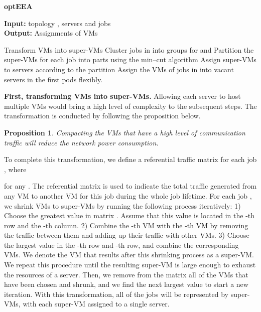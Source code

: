\documentclass[journal,single-space,two column,twoside,10pt]{IEEEtran}
\newtheorem{proposition}{Proposition}
\begin{document}
\setlength{\textfloatsep}{10pt}
\begin{algorithm}[!t]
\caption{\label{alg:vma} \textbf{optEEA}}
\textbf{Input: } topology , servers  and jobs \\
\textbf{Output: } Assignments of VMs 

\begin{algorithmic}[1]
\FOR{}
	\STATE Transform VMs into super-VMs
\ENDFOR
\STATE Cluster jobs in  into groups  for  and  
\FOR{}
	\STATE Partition the super-VMs for each job  into  parts using the min--cut algorithm
	\STATE Assign super-VMs to servers according to the partition
\ENDFOR
\STATE Assign the VMs of jobs in  into vacant servers in the first  pods flexibly.
\end{algorithmic}
\end{algorithm}

\textbf{First, transforming VMs into super-VMs.} Allowing each server to host multiple VMs would bring a high level of complexity to the subsequent steps. The transformation is conducted by following the proposition below.
\begin{proposition}
\label{prop:transformation}
Compacting the VMs that have a high level of communication traffic will reduce the network power consumption.
\end{proposition}

To complete this transformation, we define a referential traffic matrix  for each job , where

for any . The referential matrix is used to indicate the total traffic generated from any VM to another VM for this job during the whole job lifetime.
For each job , we shrink VMs to super-VMs by running the following process iteratively: 1) Choose the greatest value in matrix . Assume that this value is located in the -th row and the -th column. 2) Combine the -th VM with the -th VM by removing the traffic between them and adding up their traffic with other VMs. 3) Choose the largest value in the -th row and -th row, and combine the corresponding VMs. We denote the VM that results after this shrinking process as a super-VM. We repeat this procedure until the resulting super-VM is large enough to exhaust the resources of a server. Then, we remove from the matrix all of the VMs that have been chosen and shrunk, and we find the next largest value to start a new iteration. With this transformation, all of the jobs will be represented by super-VMs, with each super-VM assigned to a single server.
\end{document}
